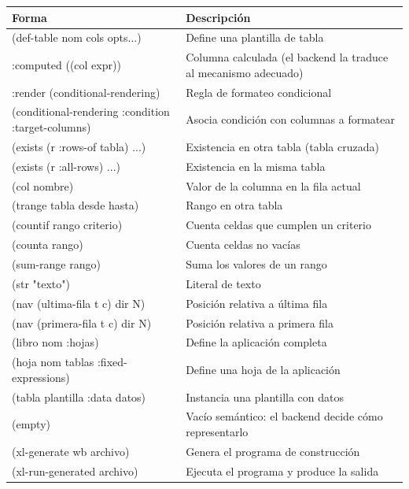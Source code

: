 \documentclass[12pt,a4paper]{report}
\begin{document}
\begin{center}
\renewcommand{\arraystretch}{1.4}
\begin{tabular}{>{\ttfamily}p{5.6cm}p{7.4cm}}
\toprule
\textbf{Forma} & \textbf{Descripción} \\
\midrule
(def-table nom cols opts...)     & Define una plantilla de tabla \\
:computed ((col expr))           & Columna calculada (el backend la traduce al mecanismo adecuado) \\
:render (conditional-rendering)  & Regla de formateo condicional \\
(conditional-rendering :condition :target-columns)
                                 & Asocia condición con columnas a formatear \\
(exists (r :rows-of tabla) ...)  & Existencia en otra tabla (tabla cruzada) \\
(exists (r :all-rows) ...)       & Existencia en la misma tabla \\
(col nombre)                     & Valor de la columna en la fila actual \\
(trange tabla desde hasta)       & Rango en otra tabla \\
(countif rango criterio)         & Cuenta celdas que cumplen un criterio \\
(counta rango)                   & Cuenta celdas no vacías \\
(sum-range rango)                & Suma los valores de un rango \\
(str "texto")                    & Literal de texto \\
(nav (ultima-fila t c) dir N)    & Posición relativa a última fila \\
(nav (primera-fila t c) dir N)   & Posición relativa a primera fila \\
(libro nom :hojas)               & Define la aplicación completa \\
(hoja nom tablas :fixed-expressions)
                                 & Define una hoja de la aplicación \\
(tabla plantilla :data datos)    & Instancia una plantilla con datos \\
(empty)                          & Vacío semántico: el backend decide cómo representarlo \\
(xl-generate wb archivo)         & Genera el programa de construcción \\
(xl-run-generated archivo)       & Ejecuta el programa y produce la salida \\
\bottomrule
\end{tabular}
\end{center}
\end{document}
